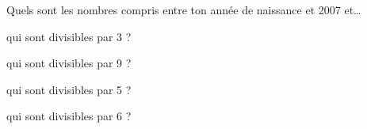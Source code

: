 Quels sont les nombres compris entre ton année de naissance et 2007 et\ldots
\begin{myenumerate}
  \item qui sont divisibles par 3 ?\dotfill\par\dotfill\par\dotfill
  \item qui sont divisibles par 9 ?\dotfill\par\dotfill\par\dotfill
  \item qui sont divisibles par 5 ?\dotfill\par\dotfill\par\dotfill
  \item qui sont divisibles par 6 ?\dotfill\par\dotfill\par\dotfill
\end{myenumerate}
